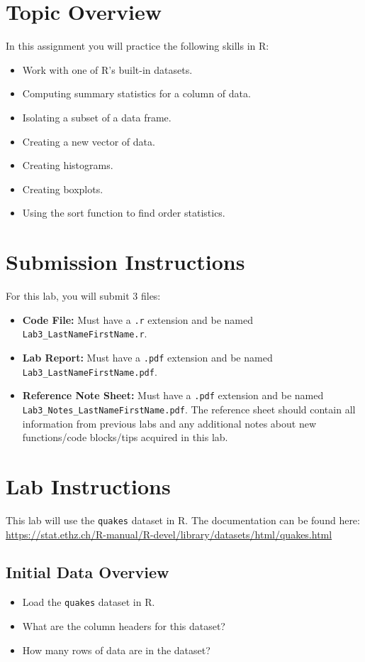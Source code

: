 \documentclass{article}
\begin{document}
\section*{Topic Overview}
In this assignment you will practice the following skills in R:
\begin{itemize}
    \item Work with one of R’s built-in datasets.
    \item Computing summary statistics for a column of data.
    \item Isolating a subset of a data frame.
    \item Creating a new vector of data.
    \item Creating histograms.
    \item Creating boxplots.
    \item Using the sort function to find order statistics.
\end{itemize}

\section*{Submission Instructions}
For this lab, you will submit 3 files:
\begin{itemize}
    \item \textbf{Code File:} Must have a \texttt{.r} extension and be named \texttt{Lab3\_LastNameFirstName.r}. 
    \item \textbf{Lab Report:} Must have a \texttt{.pdf} extension and be named \texttt{Lab3\_LastNameFirstName.pdf}.
    \item \textbf{Reference Note Sheet:} Must have a \texttt{.pdf} extension and be named \texttt{Lab3\_Notes\_LastNameFirstName.pdf}. The reference sheet should contain all information from previous labs and any additional notes about new functions/code blocks/tips acquired in this lab.
\end{itemize}

\section*{Lab Instructions}
This lab will use the \texttt{quakes} dataset in R. The documentation can be found here:
\url{https://stat.ethz.ch/R-manual/R-devel/library/datasets/html/quakes.html}

\subsection*{Initial Data Overview}
\begin{itemize}
    \item Load the \texttt{quakes} dataset in R.
    \item What are the column headers for this dataset?
    \item How many rows of data are in the dataset?
\end{itemize}
\end{document}
